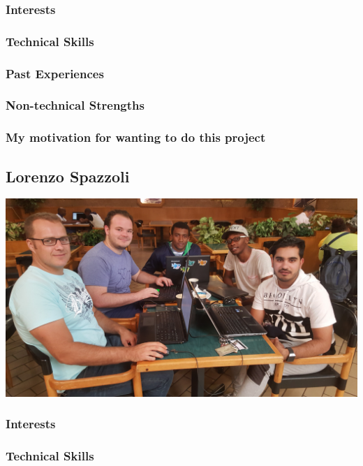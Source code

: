 \documentclass[a4paper,12pt]{article}
\begin{document}
			\subsubsection{Interests}
			
			\subsubsection{Technical Skills}
			
			\subsubsection{Past Experiences}
			
			\subsubsection{Non-technical Strengths}
			
			\subsubsection{My motivation for wanting to do this project}
		
		\newpage
		\subsection{Lorenzo Spazzoli}
		\includegraphics[width=1\textwidth]{./Pictures/the_group.jpg}\\
			\subsubsection{Interests}
			
			\subsubsection{Technical Skills}
			
\end{document}

